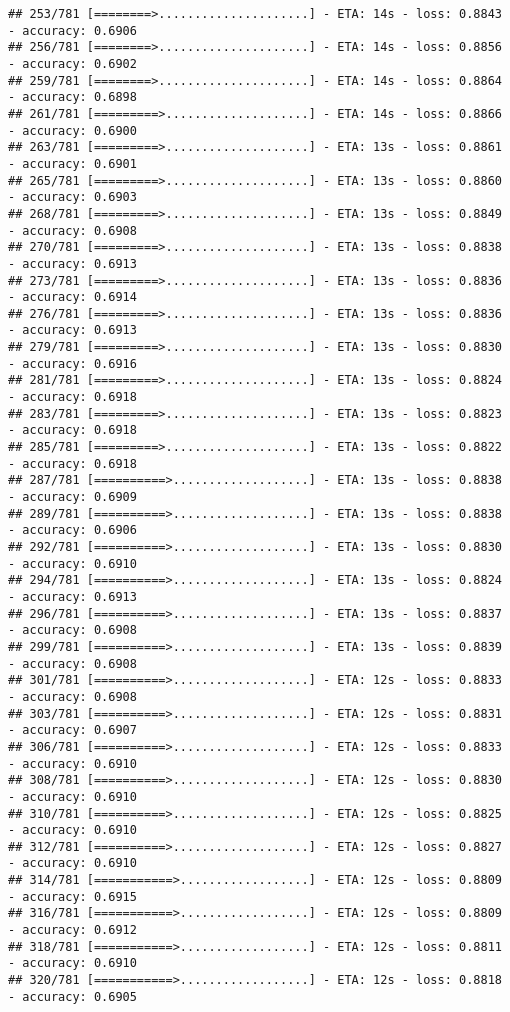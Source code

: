 \documentclass[
]{article}
\begin{document}
\begin{verbatim}
## 253/781 [========>.....................] - ETA: 14s - loss: 0.8843 - accuracy: 0.6906
## 256/781 [========>.....................] - ETA: 14s - loss: 0.8856 - accuracy: 0.6902
## 259/781 [========>.....................] - ETA: 14s - loss: 0.8864 - accuracy: 0.6898
## 261/781 [=========>....................] - ETA: 14s - loss: 0.8866 - accuracy: 0.6900
## 263/781 [=========>....................] - ETA: 13s - loss: 0.8861 - accuracy: 0.6901
## 265/781 [=========>....................] - ETA: 13s - loss: 0.8860 - accuracy: 0.6903
## 268/781 [=========>....................] - ETA: 13s - loss: 0.8849 - accuracy: 0.6908
## 270/781 [=========>....................] - ETA: 13s - loss: 0.8838 - accuracy: 0.6913
## 273/781 [=========>....................] - ETA: 13s - loss: 0.8836 - accuracy: 0.6914
## 276/781 [=========>....................] - ETA: 13s - loss: 0.8836 - accuracy: 0.6913
## 279/781 [=========>....................] - ETA: 13s - loss: 0.8830 - accuracy: 0.6916
## 281/781 [=========>....................] - ETA: 13s - loss: 0.8824 - accuracy: 0.6918
## 283/781 [=========>....................] - ETA: 13s - loss: 0.8823 - accuracy: 0.6918
## 285/781 [=========>....................] - ETA: 13s - loss: 0.8822 - accuracy: 0.6918
## 287/781 [==========>...................] - ETA: 13s - loss: 0.8838 - accuracy: 0.6909
## 289/781 [==========>...................] - ETA: 13s - loss: 0.8838 - accuracy: 0.6906
## 292/781 [==========>...................] - ETA: 13s - loss: 0.8830 - accuracy: 0.6910
## 294/781 [==========>...................] - ETA: 13s - loss: 0.8824 - accuracy: 0.6913
## 296/781 [==========>...................] - ETA: 13s - loss: 0.8837 - accuracy: 0.6908
## 299/781 [==========>...................] - ETA: 13s - loss: 0.8839 - accuracy: 0.6908
## 301/781 [==========>...................] - ETA: 12s - loss: 0.8833 - accuracy: 0.6908
## 303/781 [==========>...................] - ETA: 12s - loss: 0.8831 - accuracy: 0.6907
## 306/781 [==========>...................] - ETA: 12s - loss: 0.8833 - accuracy: 0.6910
## 308/781 [==========>...................] - ETA: 12s - loss: 0.8830 - accuracy: 0.6910
## 310/781 [==========>...................] - ETA: 12s - loss: 0.8825 - accuracy: 0.6910
## 312/781 [==========>...................] - ETA: 12s - loss: 0.8827 - accuracy: 0.6910
## 314/781 [===========>..................] - ETA: 12s - loss: 0.8809 - accuracy: 0.6915
## 316/781 [===========>..................] - ETA: 12s - loss: 0.8809 - accuracy: 0.6912
## 318/781 [===========>..................] - ETA: 12s - loss: 0.8811 - accuracy: 0.6910
## 320/781 [===========>..................] - ETA: 12s - loss: 0.8818 - accuracy: 0.6905

\end{verbatim}
\end{document}
